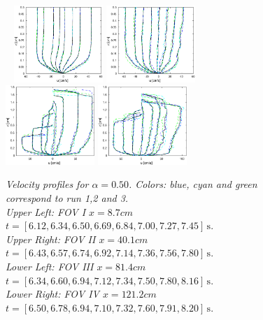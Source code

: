\documentclass[review, authoryear]{elsarticle}
\newcommand{\s}{\,\mbox{s}}
\begin{document}
\begin{figure}
        \centering
        ~ %
               \includegraphics[width=0.3\textwidth]{./Figures/BIM/case50_BIM_PIV_FOV3.eps}
                \includegraphics[width=0.3\textwidth]{./Figures/BIM/case50_BIM_PIV_FOV4.eps}
                \\
                \includegraphics[width=0.3\textwidth]{./Figures/BIM/case50_BIM_PIV_FOV5.eps}
                 \includegraphics[width=0.3\textwidth]{./Figures/BIM/case50_BIM_PIV_FOV6.eps}
                \caption{\textit{Velocity profiles for $\alpha=0.50$. Colors: blue, cyan and green correspond to run 1,2 and 3. \\Upper Left: FOV I $x=8.7cm$ $t=[6.12, 6.34, 6.50, 6.69, 6.84, 7.00, 7.27, 7.45]\s.$\\
                 \quad Upper Right: FOV II $x=40.1cm$ $t=[6.43, 6.57, 6.74, 6.92, 7.14, 7.36, 7.56, 7.80]\s.$\\
                  \quad Lower Left: FOV III $x=81.4cm$ $t=[6.34, 6.60, 6.94, 7.12, 7.34, 7.50, 7.80, 8.16]\s.$\\
                   \quad Lower Right: FOV IV $x=121.2cm$ $t=[6.50, 6.78, 6.94, 7.10, 7.32, 7.60, 7.91, 8.20]\s.$}}
              \label{fig:plot50}
      \end{figure}
\end{document}
